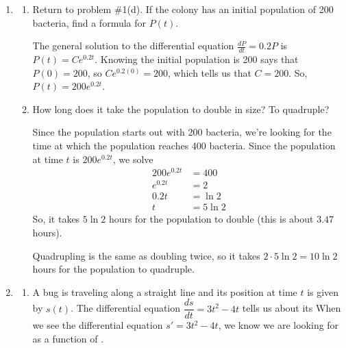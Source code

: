 \documentclass[main]{subfiles}
\begin{document}
\begin{enumerate}[resume]
    \item
    \begin{enumerate}
      
  \item
    \begin{problem}[\stretch{0.8}]
    
      Return to problem \#1(d). If the colony has an initial population of 200 bacteria, find a
      formula for $P(t)$. 
    \end{problem}

    \begin{solution}
      The general solution to the differential equation $\frac{dP}{dt} =
      0.2 P$ is $P(t) = C e^{0.2 t}$.  Knowing the initial population is
      200 says that $P(0) = 200$, so $C e^{0.2 (0)} = 200$, which tells us
      that $C = 200$.  So, $P(t) = \boxed{200 e^{0.2 t}}$.
    \end{solution}
    
  \item
    \begin{problem}[\stretch{1}]
      How long does it take the population to double in size?  To
      quadruple? 
    \end{problem}

    \begin{solution}
      Since the population starts out with 200 bacteria, we're looking for
      the time at which the population reaches 400 bacteria.  Since the
      population at time $t$ is $200 e^{0.2 t}$, we solve
      \begin{align*}
        200 e^{0.2 t} &= 400 \\
        e^{0.2 t} &= 2 \\
        0.2 t &= \ln 2 \\
        t &= 5 \ln 2
      \end{align*}
      So, it takes $\boxed{5 \ln 2}$ hours for the population to double
      (this is about $3.47$ hours).

      Quadrupling is the same as doubling twice, so it takes $2 \cdot 5
      \ln 2 = \boxed{10 \ln 2}$ hours for the population to quadruple. 
    \end{solution}
    
    \end{enumerate}

\pspace{\newpage}
    
\item 
  \begin{enumerate}
  \item
    \begin{problem}
    A bug is traveling along a straight line and its position at time $t$
    is given by $s(t)$. The differential equation 
    $\dfrac{ds}{dt}=3t^2-4t$ tells us about its 
      When we see the differential equation $s' = 3t^2-4t$, we know we are
      looking for  as a function of .
    \end{problem}


\end{enumerate}
\end{enumerate}
\end{document}
